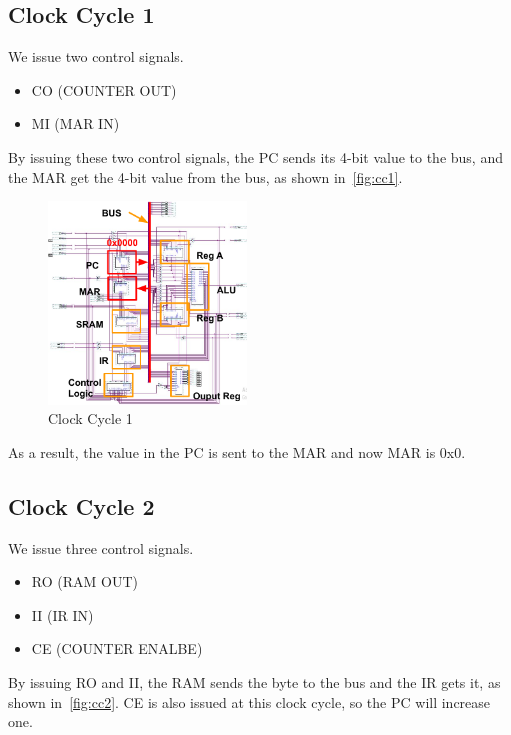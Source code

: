 \subsection{Clock Cycle 1}

We issue two control signals.

\begin{itemize}
	\item CO (COUNTER OUT)
	\item MI (MAR IN)
\end{itemize}


By issuing these two control signals, the PC sends its 4-bit value to the bus, and the MAR get the 4-bit value from the bus, as shown in~\autoref{fig:cc1}.

\begin{figure}[th]
	\includegraphics[width=0.47\textwidth]{figures/cc1}
	\centering
	\caption{Clock Cycle 1}
	\label{fig:cc1}
\end{figure}

As a result, the value in the PC is sent to the MAR and now MAR is 0x0.


\subsection{Clock Cycle 2}

We issue three control signals.

\begin{itemize}
	\item RO (RAM OUT)
	\item II (IR IN)
	\item CE (COUNTER ENALBE)
\end{itemize}

By issuing RO and II, the RAM sends the byte to the bus and the IR gets it, as shown in~\autoref{fig:cc2}. CE is also issued at this clock cycle, so the PC will increase one.

